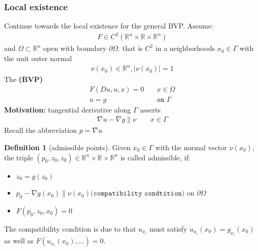 \documentclass[a4paper,11pt,oneside,fleqn]{book}
\theoremstyle{definition}
\newtheorem{definition}{Definition}[section]
\theoremstyle{remark}
\begin{document}
\subsubsection*{Local existence}
Continue towards the local existence for the general BVP. Assume:
\begin{align*}
	F \in C^2(\mathbb{R}^n \times \mathbb{R} \times \mathbb{R}^n)
\end{align*}
and $\Omega \subset \mathbb{R}^n$ open with boundary $\partial \Omega$. that is $C^2$ in a neighborhoods $x_0 \in \Gamma$ with the unit outer normal
\begin{align*}
	\nu(x_0) \in \mathbb{R}^n, |\nu(x_0)| = 1
\end{align*}
The \textbf{(BVP)}
\begin{align*}
	F(Du, u, x) = 0 &\quad x \in \Omega\\
	u = g &\quad \texttt{on } \Gamma
\end{align*}
\textbf{Motivation:}
tangential derivative along $\Gamma$ asserts 
\begin{align*}
	\nabla u - \nabla g \| \nu \qquad x \in \Gamma
\end{align*}
Recall the abbreviation $p = \nabla u$

\begin{definition}[admissible points]
	Given $x_0 \in \Gamma$ with the normal vector $\nu(x_0)$, the triple $(p_0, z_0, z_0) \in \mathbb{R}^n \times \mathbb{R} \times \mathbb{R}^n$ is called admissible, if:
	\begin{itemize}
		\item $z_0 = g(z_0)$
		\item $p_0 - \nabla g(x_0) \| \nu(x_0)\texttt{(compatibility condtition)}$ on $\partial\Omega$
		\item $F(p_0, z_0, x_0) =0$
	\end{itemize}
	The compatibility condition is due to that $u_{x_i}$ must satisfy $u_{x_i}(x_0) = g_{x_i}(x_0)$ as well as $F(u_{x_i}(x_0), \dots) = 0$. 
\end{definition}
\end{document}
